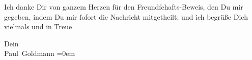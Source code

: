 \pstart
           Ich danke Dir von ganzem Herzen für den Freundſchafts-Beweis, den Du mir gegeben,
               indem Du mir{ }ſofort die {\pb}Nachricht mitgetheilt; und
               ich begrüße Dich vielmals und in Treue\pend
           
\pstart
           Dein {\\[\baselineskip]}\spacefill\mbox{Paul Goldmann}\pend
           \leftskip=0em{}\endnumbering{}  \newcommand{\dateiname}{L02618}\newcommand{\titel}{Paul Goldmann an Arthur Schnitzler, 3. 11. [1894]}\newcommand{\editorInnen}{Martin Anton Müller und Laura Untner}
